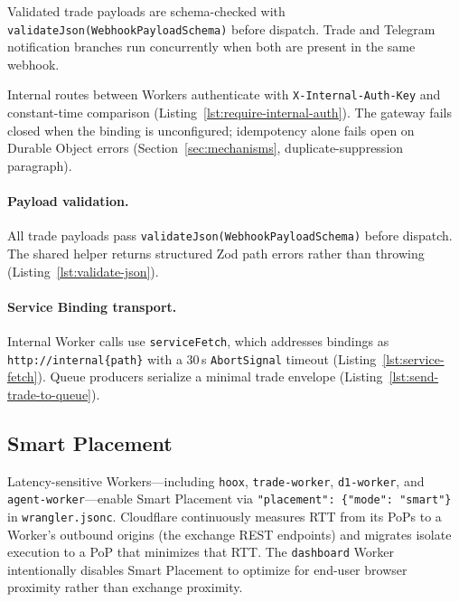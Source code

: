 Validated trade payloads are schema-checked with \texttt{validateJson(WebhookPayloadSchema)} before dispatch. Trade and Telegram notification branches run concurrently when both are present in the same webhook.


Internal routes between Workers authenticate with \texttt{X-Internal-Auth-Key} and constant-time comparison (Listing~\ref{lst:require-internal-auth}). The gateway fails closed when the binding is unconfigured; idempotency alone fails open on Durable Object errors (Section~\ref{sec:mechanisms}, duplicate-suppression paragraph).


\paragraph{Payload validation.} All trade payloads pass \texttt{validateJson(WebhookPayloadSchema)} before dispatch. The shared helper returns structured Zod path errors rather than throwing (Listing~\ref{lst:validate-json}).


\paragraph{Service Binding transport.} Internal Worker calls use \texttt{serviceFetch}, which addresses bindings as \texttt{http://internal\{path\}} with a 30\,s \texttt{AbortSignal} timeout (Listing~\ref{lst:service-fetch}). Queue producers serialize a minimal trade envelope (Listing~\ref{lst:send-trade-to-queue}).


\subsection{Smart Placement}

Latency-sensitive Workers---including \texttt{hoox}, \texttt{trade-worker}, \texttt{d1-worker}, and \texttt{agent-worker}---enable Smart Placement via \texttt{"placement": \{"mode": "smart"\}} in \texttt{wrangler.jsonc}. Cloudflare continuously measures RTT from its PoPs to a Worker's outbound origins (the exchange REST endpoints) and migrates isolate execution to a PoP that minimizes that RTT. The \texttt{dashboard} Worker intentionally disables Smart Placement to optimize for end-user browser proximity rather than exchange proximity.

